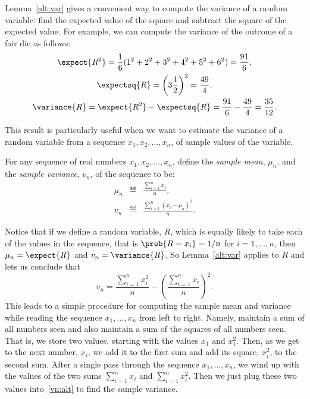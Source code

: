 \begin{editingnotes}

Lemma~\ref{alt:var} gives a convenient way to compute the variance of a
random variable: find the expected value of the square and subtract the
square of the expected value.  For example, we can compute the variance of
the outcome of a fair die as follows:
\begin{gather*}
  \expect{R^2} = \frac{1}{6} (1^2 + 2^2 + 3^2 + 4^2 + 5^2 + 6^2) = \frac{91}{6}, \\
  \expectsq{R} = \left(3 \frac{1}{2}\right)^2 = \frac{49}{4}, \\
  \variance{R}  = \expect{R^2} - \expectsq{R}
  = \frac{91}{6} - \frac{49}{4} = \frac{35}{12}.
\end{gather*}

This result is particularly useful when we want to estimate the variance
of a random variable from a sequence $x_1,x_2,\dots,x_n$, of sample values
of the variable.

\begin{definition*}
For any sequence of real numbers $x_1,x_2,\dots,x_n$, define the
\emph{sample mean}, $\mu_n$, and the \emph{sample variance}, $v_n$, of the
sequence to be:
\begin{eqnarray*}
\mu_n  & \eqdef & \frac{\sum_{i=1}^n x_i}{n},\\
v_n  & \eqdef & \frac{\sum_{i=1}^n (x_i - \mu_n)^2}{n}.
\end{eqnarray*}
\end{definition*}
Notice that if we define a random variable, $R$, which is equally likely
to take each of the values in the sequence, that is $\prob{R = x_i} = 1/n$
for $i = 1,\dots,n$, then $\mu_n = \expect{R}$ and $v_n = \variance{R}$.
So Lemma~\ref{alt:var} applies to $R$ and lets us conclude that
\begin{equation}\label{vn:alt}
v_n = \frac{\sum_{i=1}^n x_i^2}{n} - \left(\frac{\sum_{i=1}^n x_i}{n}\right)^2.
\end{equation}
This leads to a simple procedure for computing the sample mean and
variance while reading the sequence $x_1,\dots,x_n$ from left to right.
Namely, maintain a sum of all numbers seen and also maintain a sum of the
squares of all numbers seen.  That is, we store two values, starting with
the values $x_1$ and $x_1^2$.  Then, as we get to the next number, $x_i$,
we add it to the first sum and add its square, $x_{i}^2$, to the second
sum.  After a single pass through the sequence $x_1,\dots,x_n$, we wind up
with the values of the two sums $\sum_{i=1}^n x_i$ and $\sum_{i=1}^n
x_i^2$.  Then we just plug these two values into~\eqref{vn:alt} to find
the sample variance.

\end{editingnotes}

